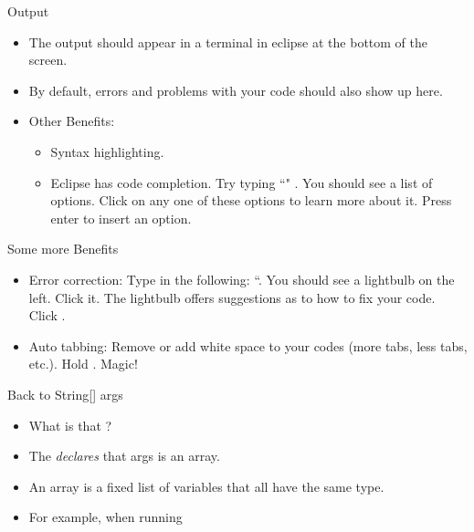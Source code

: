 \begin{frame}{Output}
\begin{itemize}
\item The output should appear in a terminal in eclipse at the bottom of the screen.
\item By default, errors and problems with your code should also show up here. \pause
\item Other Benefits:
\begin{itemize}
\item Syntax highlighting.
\item Eclipse has code completion. Try typing ``" . You should see a list of options. Click on any one of these options to learn more about it. Press enter to insert an option. \pause
\end{itemize}
\end{itemize}

\end{frame}
\begin{frame}{Some more Benefits}
\begin{itemize}
\item Error correction: Type in the following: ``. You should see a lightbulb on the left. Click it. The lightbulb offers suggestions as to how to fix your code. Click . \pause
\item Auto tabbing: Remove or add white space to your codes (more tabs, less tabs, etc.). Hold . Magic!
\end{itemize}
\end{frame}

\begin{frame}[fragile]{Back to String[] args}
\begin{itemize}
\item What is that \code{\texttt{[]}}?
\item The \code{\texttt{[]}} \emph{declares} that args is an array.
\item An array is a fixed list of variables that all have the same type. \pause
\item For example, when running \\
\begin{semiverbatim}\end{semiverbatim}
\end{itemize}
\end{frame}

